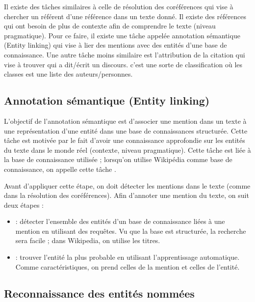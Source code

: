 \documentclass{KodeBook}
\begin{document}
Il existe des tâches similaires à celle de résolution des coréférences qui vise à chercher un référent d'une référence dans un texte donné. 
Il existe des références qui ont besoin de plus de contexte afin de comprendre le texte (niveau pragmatique). 
Pour ce faire, il existe une tâche appelée annotation sémantique (Entity linking) qui vise à lier des mentions avec des entités d'une base de connaissance. 
Une autre tâche moins similaire est l'attribution de la citation qui vise à trouver qui a dit/écrit un discours. 
c'est une sorte de classification où les classes est une liste des auteurs/personnes.


\subsection{Annotation sémantique (Entity linking)}

L'objectif de l'annotation sémantique est d'associer une mention dans un texte à une représentation d'une entité dans une base de connaissances structurée. 
Cette tâche est motivée par le fait d'avoir une connaissance approfondie sur les entités du texte dans le monde réel (contexte, niveau pragmatique).
Cette tâche est liée à la base de connaissance utilisée ; lorsqu'on utilise Wikipédia comme base de connaissance, on appelle cette tâche .

Avant d'appliquer cette étape, on doit détecter les mentions dans le texte (comme dans la résolution des coréférences).
Afin d'annoter une mention du texte, on suit deux étapes :
\begin{itemize}
	\item {} : détecter l'ensemble des entités d'un base de connaissance liées à une mention en utilisant des requêtes.
	Vu que la base est structurée, la recherche sera facile ; dans Wikipedia, on utilise les titres.
	\item {} : trouver l'entité la plus probable en utilisant l'apprentissage automatique. 
	Comme caractéristiques, on prend celles de la mention et celles de l'entité.
\end{itemize}

\subsection{Reconnaissance des entités nommées}
\end{document}
